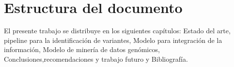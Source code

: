 \section*{Estructura del documento}

El presente trabajo se distribuye en los siguientes capítulos: Estado del arte, pipeline para la identificación de variantes, Modelo para integración de la información, Modelo de minería de datos genómicos, Conclusiones,recomendaciones y trabajo futuro y  Bibliografía.